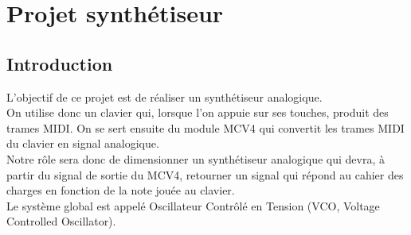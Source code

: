 \part{Projet synthétiseur}
\chapter{Introduction}

L’objectif de ce projet est de réaliser un synthétiseur analogique.\\
On utilise donc un clavier qui, lorsque l’on appuie sur ses touches, produit des trames MIDI. 
On se sert ensuite du module MCV4 qui convertit les trames MIDI du clavier en signal analogique.\\

Notre rôle sera donc de dimensionner un synthétiseur analogique qui devra, à partir du signal de sortie du MCV4, 
retourner un signal qui répond au cahier des charges en fonction de la note jouée au clavier.\\

Le système global est appelé Oscillateur Contrôlé en Tension (VCO, Voltage Controlled Oscillator).










